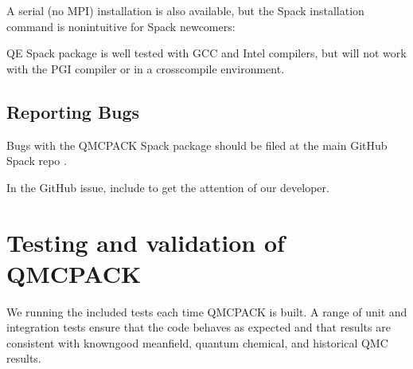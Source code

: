 \documentclass[letterpaper,10pt,english]{sphinxmanual}
\begin{document}
A serial (no MPI) installation is also available, but the Spack installation command
is non\sphinxhyphen{}intuitive for Spack newcomers:

\begin{sphinxVerbatim}[commandchars=\\\{\}]
    
\end{sphinxVerbatim}

QE Spack package is well tested with GCC and Intel compilers, but will not work
with the PGI compiler or in a cross\sphinxhyphen{}compile environment.


\subsection{Reporting Bugs}
\label{\detokenize{installation:reporting-bugs}}
Bugs with the QMCPACK Spack package should be filed at the main GitHub
Spack repo .

In the GitHub issue, include  to get the attention
of our developer.


\section{Testing and validation of QMCPACK}
\label{\detokenize{installation:testing-and-validation-of-qmcpack}}\label{\detokenize{installation:testing}}
We  running the included tests each time
QMCPACK is built. A range of unit and integration tests ensure that
the code behaves as expected and that results are consistent with
known\sphinxhyphen{}good mean\sphinxhyphen{}field, quantum chemical, and historical QMC results.
\end{document}

